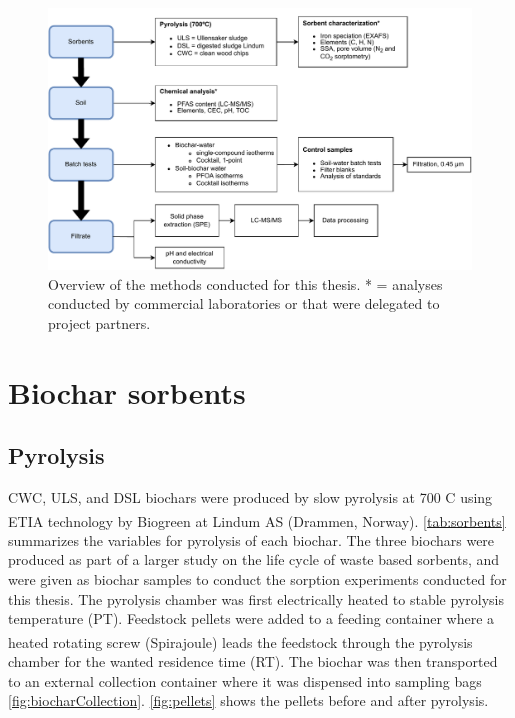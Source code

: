 \begin{figure}
    \centering
    \includegraphics[width=\textwidth]{Diagrams/Methods-General_overview_methods.pdf}
    \caption{Overview of the methods conducted for this thesis. * = analyses conducted by commercial laboratories or that were delegated to project partners.}
    \label{fig:methodoverview}
\end{figure}

\section{Biochar sorbents}
\subsection{Pyrolysis}
CWC, ULS, and DSL biochars were produced by slow pyrolysis at 700 \textdegree C using ETIA technology by Biogreen\textsuperscript{\textcopyright} at Lindum AS (Drammen, Norway). \cref{tab:sorbents} summarizes the variables for pyrolysis of each biochar. The three biochars were produced as part of a larger study on the life cycle of waste based sorbents, and were given as biochar samples to conduct the sorption experiments conducted for this thesis. The pyrolysis chamber was first electrically heated to stable pyrolysis temperature (PT). Feedstock pellets were added to a feeding container where a heated rotating screw (Spirajoule\textsuperscript{\textregistered}) leads the feedstock through the pyrolysis chamber for the wanted residence time (RT). The biochar was then transported to an external collection container where it was dispensed into sampling bags \cref{fig:biocharCollection}. \cref{fig:pellets} shows the pellets before and after pyrolysis. 

